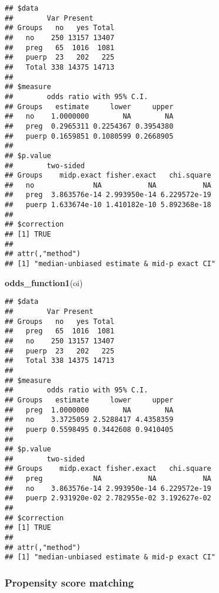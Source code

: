 \documentclass[
]{article}
\newenvironment{Shaded}{\begin{snugshade}}{\end{snugshade}}
\newcommand{\KeywordTok}[1]{\textcolor[rgb]{0.13,0.29,0.53}{\textbf{#1}}}
\newcommand{\NormalTok}[1]{#1}
\newcommand{\OperatorTok}[1]{\textcolor[rgb]{0.81,0.36,0.00}{\textbf{#1}}}
\newcommand{\StringTok}[1]{\textcolor[rgb]{0.31,0.60,0.02}{#1}}
\begin{document}
\begin{Shaded}
\end{Shaded}

\begin{verbatim}
## $data
##        Var Present
## Groups   no   yes Total
##   no    250 13157 13407
##   preg   65  1016  1081
##   puerp  23   202   225
##   Total 338 14375 14713
## 
## $measure
##        odds ratio with 95% C.I.
## Groups   estimate     lower     upper
##   no    1.0000000        NA        NA
##   preg  0.2965311 0.2254367 0.3954380
##   puerp 0.1659851 0.1080599 0.2668905
## 
## $p.value
##        two-sided
## Groups    midp.exact fisher.exact   chi.square
##   no              NA           NA           NA
##   preg  3.863576e-14 2.993950e-14 6.229572e-19
##   puerp 1.633674e-10 1.410182e-10 5.892368e-18
## 
## $correction
## [1] TRUE
## 
## attr(,"method")
## [1] "median-unbiased estimate & mid-p exact CI"
\end{verbatim}

\begin{Shaded}
\begin{Highlighting}[]
\KeywordTok{odds_function1}\NormalTok{(oi)}
\end{Highlighting}
\end{Shaded}

\begin{verbatim}
## $data
##        Var Present
## Groups   no   yes Total
##   preg   65  1016  1081
##   no    250 13157 13407
##   puerp  23   202   225
##   Total 338 14375 14713
## 
## $measure
##        odds ratio with 95% C.I.
## Groups   estimate     lower     upper
##   preg  1.0000000        NA        NA
##   no    3.3725059 2.5288417 4.4358359
##   puerp 0.5598495 0.3442608 0.9410405
## 
## $p.value
##        two-sided
## Groups    midp.exact fisher.exact   chi.square
##   preg            NA           NA           NA
##   no    3.863576e-14 2.993950e-14 6.229572e-19
##   puerp 2.931920e-02 2.782955e-02 3.192627e-02
## 
## $correction
## [1] TRUE
## 
## attr(,"method")
## [1] "median-unbiased estimate & mid-p exact CI"
\end{verbatim}

\hypertarget{propensity-score-matching}{%
\subsubsection{Propensity score
matching}\label{propensity-score-matching}}
\end{document}
